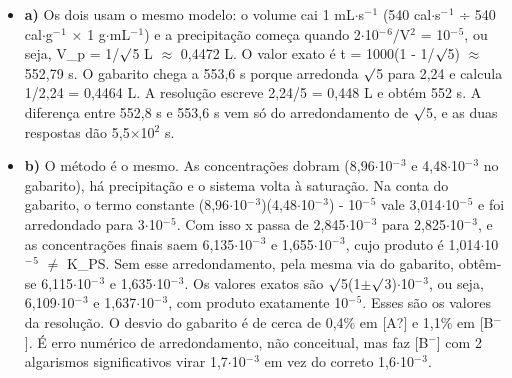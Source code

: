 \documentclass{article}%
\begin{document}
\begin{itemize}%
\item%
\textbf{a)} Os dois usam o mesmo modelo: o volume cai 1 mL$\cdot$s$^{-}$$^{1}$ (540 cal$\cdot$s$^{-}$$^{1}$ ÷ 540 cal$\cdot$g$^{-}$$^{1}$ $\times$ 1 g$\cdot$mL$^{-}$$^{1}$) e a precipitação começa quando 2$\cdot$10$^{-}$$^{6}$/V$^2$ = 10$^{-}$$^{5}$, ou seja, V\_p = 1/$\surd$5 L $\approx$ 0,4472 L. O valor exato é t = 1000(1 - 1/$\surd$5) $\approx$ 552,79 s. O gabarito chega a 553,6 s porque arredonda $\surd$5 para 2,24 e calcula 1/2,24 = 0,4464 L. A resolução escreve 2,24/5 = 0,448 L e obtém 552 s. A diferença entre 552,8 s e 553,6 s vem só do arredondamento de $\surd$5, e as duas respostas dão 5,5$\times$10$^2$ s.%
\item%
\textbf{b)} O método é o mesmo. As concentrações dobram (8,96$\cdot$10$^{-}$$^3$ e 4,48$\cdot$10$^{-}$$^3$ no gabarito), há precipitação e o sistema volta à saturação. Na conta do gabarito, o termo constante (8,96$\cdot$10$^{-}$$^3$)(4,48$\cdot$10$^{-}$$^3$) - 10$^{-}$$^{5}$ vale 3,014$\cdot$10$^{-}$$^{5}$ e foi arredondado para 3$\cdot$10$^{-}$$^{5}$. Com isso x passa de 2,845$\cdot$10$^{-}$$^3$ para 2,825$\cdot$10$^{-}$$^3$, e as concentrações finais saem 6,135$\cdot$10$^{-}$$^3$ e 1,655$\cdot$10$^{-}$$^3$, cujo produto é 1,014$\cdot$10$^{-}$$^{5}$ $\neq$ K\_PS. Sem esse arredondamento, pela mesma via do gabarito, obtêm{-}se 6,115$\cdot$10$^{-}$$^3$ e 1,635$\cdot$10$^{-}$$^3$. Os valores exatos são $\surd$5(1$\pm$$\surd$3)$\cdot$10$^{-}$$^3$, ou seja, 6,109$\cdot$10$^{-}$$^3$ e 1,637$\cdot$10$^{-}$$^3$, com produto exatamente 10$^{-}$$^{5}$. Esses são os valores da resolução. O desvio do gabarito é de cerca de 0,4\% em {[}A?{]} e 1,1\% em {[}B$^{-}${]}. É erro numérico de arredondamento, não conceitual, mas faz {[}B$^{-}${]} com 2 algarismos significativos virar 1,7$\cdot$10$^{-}$$^3$ em vez do correto 1,6$\cdot$10$^{-}$$^3$.%
\end{itemize}%
\end{document}

